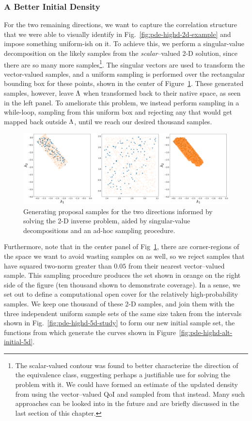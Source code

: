 \subsubsection{A Better Initial Density}
For the two remaining directions, we want to capture the correlation structure that we were able to visually identify in Fig.~\ref{fig:pde-highd-2d-example} and impose something uniform-ish on it.
To achieve this, we perform a singular-value decomposition on the likely samples from the \emph{scalar}--valued 2-D solution, since there are so many more samples\footnote{ The scalar-valued contour was found to better characterize the direction of the equivalence class, suggesting perhaps a justifiable use for solving the problem with it. We could have formed an estimate of the updated density from using the vector--valued QoI and sampled from that instead. Many such approaches can be looked into in the future and are briefly discussed in the last section of this chapter.}.
The singular vectors are used to transform the vector-valued samples, and a uniform sampling is performed over the rectangular bounding box for these points, shown in the center of Figure~\ref{fig:pde-highd-2d-study}.
These generated samples, however, leave ${\Lambda}$ when transformed back to their native space, as seen in the left panel.
To ameliorate this problem, we instead perform sampling in a while-loop, sampling from this uniform box and rejecting any that would get mapped back outside ${\Lambda}$, until we reach our desired thousand samples.


\begin{figure}[htbp]
\centering
  \includegraphics[width=0.95\linewidth]{figures/pde-highd/pde-highd-alt_initial_D2_m100}
\caption{
Generating proposal samples for the two directions informed by solving the 2-D inverse problem, aided by singular-value decompositions and an ad-hoc sampling procedure.
}
\label{fig:pde-highd-2d-study}
\end{figure}

Furthermore, note that in the center panel of Fig~\ref{fig:pde-highd-2d-study}, there are corner-regions of the space we want to avoid wasting samples on as well, so we reject samples that have squared two-norm greater than $0.05$ from their nearest vector--valued sample.
This sampling procedure produces the set shown in orange on the right side of the figure (ten thousand shown to demonstrate coverage).
In a sense, we set out to define a computational open cover for the relatively high-probability samples.
We keep one thousand of these 2-D samples, and join them with the three independent uniform sample sets of the same size taken from the intervals shown in Fig.~\ref{fig:pde-highd-5d-study} to form our new initial sample set, the functions from which generate the curves shown in Figure~\ref{fig:pde-highd-alt-initial-5d}.

